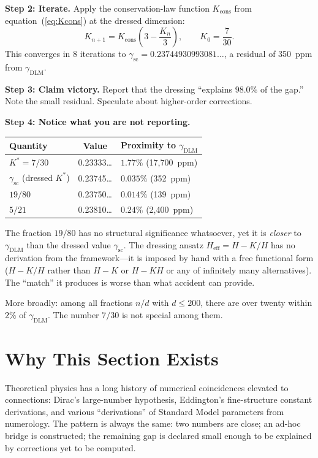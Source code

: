 \documentclass[11pt,a4paper]{article}
\theoremstyle{definition}
\theoremstyle{remark}
\begin{document}
\textbf{Step 2: Iterate.} Apply the conservation-law function $K_{\mathrm{cons}}$ from equation~(\ref{eq:Kcons}) at the dressed dimension:
\[
K_{n+1}=K_{\mathrm{cons}}\!\left(3-\frac{K_n}{3}\right),\qquad K_0=\frac{7}{30}.
\]
This converges in 8 iterations to $\gamma_{\mathrm{sc}}=0.23744930993081\ldots$, a residual of 350~ppm from $\gamma_{\mathrm{DLM}}$.

\textbf{Step 3: Claim victory.} Report that the dressing ``explains $98.0\%$ of the gap.'' Note the small residual. Speculate about higher-order corrections.

\textbf{Step 4: Notice what you are not reporting.}

\begin{center}
\begin{tabular}{lcl}
\toprule
Quantity & Value & Proximity to $\gamma_{\mathrm{DLM}}$ \\
\midrule
$K^*=7/30$ & 0.23333\ldots & $1.77\%$ (17{,}700~ppm) \\
$\gamma_{\mathrm{sc}}$ (dressed $K^*$) & 0.23745\ldots & $0.035\%$ (352~ppm) \\
$19/80$ & 0.23750\ldots & $0.014\%$ (139~ppm) \\
$5/21$ & 0.23810\ldots & $0.24\%$ (2{,}400~ppm) \\
\bottomrule
\end{tabular}
\end{center}

The fraction $19/80$ has no structural significance whatsoever, yet it is \emph{closer} to $\gamma_{\mathrm{DLM}}$ than the dressed value $\gamma_{\mathrm{sc}}$. The dressing ansatz $H_{\mathrm{eff}}=H-K/H$ has no derivation from the framework---it is imposed by hand with a free functional form ($H-K/H$ rather than $H-K$ or $H-KH$ or any of infinitely many alternatives). The ``match'' it produces is worse than what accident can provide.

More broadly: among all fractions $n/d$ with $d\leq 200$, there are over twenty within $2\%$ of $\gamma_{\mathrm{DLM}}$. The number $7/30$ is not special among them.


\section{Why This Section Exists}\label{sec:whynumerology}

Theoretical physics has a long history of numerical coincidences elevated to connections: Dirac's large-number hypothesis, Eddington's fine-structure constant derivations, and various ``derivations'' of Standard Model parameters from numerology. The pattern is always the same: two numbers are close; an ad-hoc bridge is constructed; the remaining gap is declared small enough to be explained by corrections yet to be computed.
\end{document}
